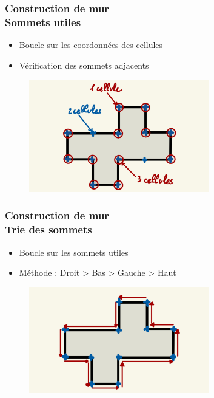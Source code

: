 \documentclass{beamer}
\begin{document}
\begin{frame}
    \frametitle{Construction de mur \\
                \small Sommets utiles}
    \begin{block}{}
        \begin{itemize}
            \item Boucle sur les coordonnées des cellules
            \item Vérification des sommets adjacents
        \end{itemize}
    \end{block}
    \begin{figure}
        \centering
        \includegraphics[width=0.7\textwidth]{images/sommets_utiles.jpg}
    \end{figure}
\end{frame}

\begin{frame}
    \frametitle{Construction de mur \\
                \small Trie des sommets}
    \begin{block}{}
        \begin{itemize}
            \item Boucle sur les sommets utiles
            \item Méthode : Droit > Bas > Gauche > Haut
        \end{itemize}
    \end{block}
    \begin{figure}
        \centering
        \includegraphics[width=0.7\textwidth]{images/tri_sommet.jpg}
    \end{figure}
\end{frame}
\end{document}
